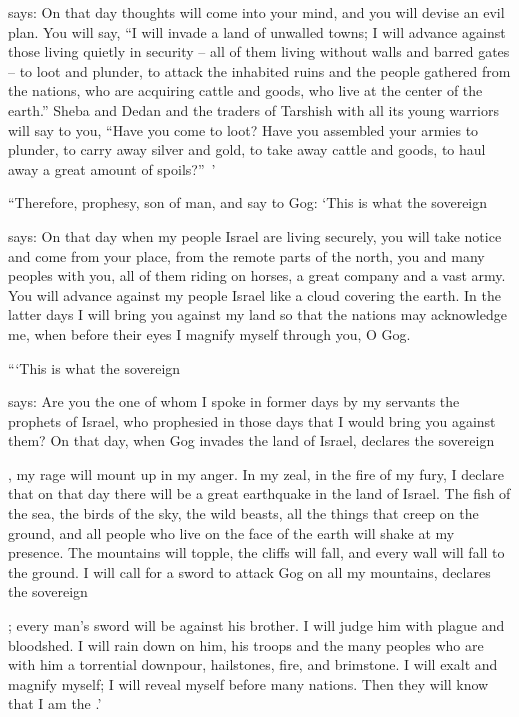 {{}
says: On that day
thoughts
will come
into your mind,
and you will devise
an evil
plan.
You will say,
“I will invade
a land
of unwalled
towns; I will advance
against those living
quietly
in security
– all
of them living
without
walls
and barred
gates –
to loot
and plunder,
to attack
the inhabited
ruins
and the people
gathered
from the nations,
who are acquiring
cattle
and goods,
who live
at
the center
of the earth.”
Sheba
and Dedan
and the traders
of Tarshish
with all
its young warriors
will say
to you, “Have you come
to loot? Have you
assembled
your armies
to plunder,
to carry away
silver
and gold,
to take away
cattle
and goods,
to haul away
a great amount
of spoils?” ’
\par }{\PP {}“Therefore,
prophesy,
son
of man,
and say
to Gog: ‘This is what
the sovereign

{}
says: On that day
when
my people
Israel
are living
securely,
you will take notice
and come
from your place,
from the remote
parts of the north,
you
and many
peoples
with
you, all
of them riding
on horses,
a great
company
and a vast
army.
You will advance
against
my people
Israel
like a cloud
covering
the earth.
In the latter
days
I will
bring
you against
my land
so
that the nations
may acknowledge
me, when before their eyes
I magnify
myself through you, O Gog.
\par }{\PP {}“‘This is what
the sovereign

{}
says: Are you
the one of whom
I spoke
in former
days
by
my servants
the prophets
of Israel,
who prophesied
in those
days
that I would bring
you against them?
On
that day, when
Gog
invades
the land
of Israel,
declares
the sovereign

{}, my rage
will mount up
in my anger.
In my zeal,
in the fire
of my fury,
I declare
that on that day
there will be
a great
earthquake
in the land
of Israel.
The fish
of the sea,
the birds
of the sky,
the wild
beasts,
all
the things
that creep
on
the ground,
and all
people
who
live on
the face
of the earth
will shake
at my presence.
The mountains
will topple,
the cliffs
will fall,
and every
wall
will fall
to the ground.
I will call
for a sword
to attack Gog on
all
my mountains,
declares
the sovereign

{}; every man’s
sword
will be
against his brother.
I will judge
him
with plague
and bloodshed.
I will rain
down
on him,
his troops
and the many
peoples
who
are with
him a torrential
downpour, hailstones,
fire,
and brimstone.
I will exalt and magnify
myself;
I will reveal myself
before
many
nations.
Then they will know
that
I am
the {}.’

}

